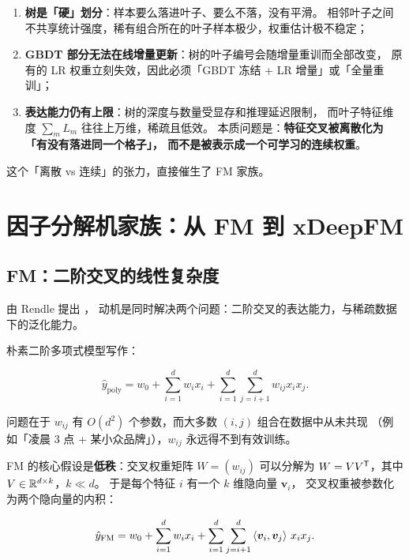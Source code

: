 \begin{pitfall}
\begin{enumerate}
  \item \textbf{树是「硬」划分}：样本要么落进叶子、要么不落，没有平滑。
        相邻叶子之间不共享统计强度，稀有组合所在的叶子样本极少，权重估计极不稳定；
  \item \textbf{GBDT 部分无法在线增量更新}：树的叶子编号会随增量重训而全部改变，
        原有的 LR 权重立刻失效，因此必须「GBDT 冻结 + LR 增量」或「全量重训」；
  \item \textbf{表达能力仍有上限}：树的深度与数量受显存和推理延迟限制，
        而叶子特征维度 $\sum_m L_m$ 往往上万维，稀疏且低效。
        本质问题是：\textbf{特征交叉被离散化为「有没有落进同一个格子」，
        而不是被表示成一个可学习的连续权重}。
\end{enumerate}
这个「离散 vs 连续」的张力，直接催生了 FM 家族。
\end{pitfall}

\section{因子分解机家族：从 FM 到 xDeepFM}

\subsection{FM：二阶交叉的线性复杂度}

 由 Rendle 提出 \cite{rendle2010fm}，
动机是同时解决两个问题：二阶交叉的表达能力，与稀疏数据下的泛化能力。

朴素二阶多项式模型写作：

\begin{equation}
\hat{y}_{\mathrm{poly}} = w_0 + \sum_{i=1}^{d} w_i x_i + \sum_{i=1}^{d}\sum_{j=i+1}^{d} w_{ij} x_i x_j .
\label{eq:poly2}
\end{equation}

问题在于 $w_{ij}$ 有 $O(d^2)$ 个参数，而大多数 $(i,j)$ 组合在数据中从未共现
（例如「凌晨 3 点 + 某小众品牌」），$w_{ij}$ 永远得不到有效训练。

FM 的核心假设是\textbf{低秩}：交叉权重矩阵 $W = (w_{ij})$ 可以分解为
$W = V V^{\mathsf{T}}$，其中 $V \in \mathbb{R}^{d \times k}$，$k \ll d$。
于是每个特征 $i$ 有一个 $k$ 维隐向量 $\bm{v}_i$，
交叉权重被参数化为两个隐向量的内积：

\begin{equation}
\hat{y}_{\mathrm{FM}} = w_0 + \sum_{i=1}^{d} w_i x_i
+ \sum_{i=1}^{d}\sum_{j=i+1}^{d} \left\langle \bm{v}_i, \bm{v}_j \right\rangle \, x_i x_j .
\label{eq:fm}
\end{equation}

